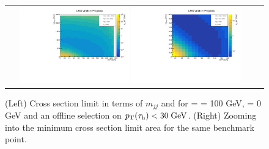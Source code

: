 \begin{figure}[tbh!]
	\centering
	\begin{tabular}{cc}
		\includegraphics[width=0.45\textwidth]{analysis/pics/JetInvMass_vs_MET_xsec_chi100_lsp000_taupt30.pdf}
		\includegraphics[width=0.45\textwidth]{analysis/pics/JetInvMass_vs_MET_xsec_chi100_lsp000_taupt30_zoom.pdf} 		
	\end{tabular}
	\caption{(Left) Cross section limit in terms of $m_{jj}$ and \met for \charginopm = \neutralinotwo = 100 GeV, \neutralinoone = 0 GeV and an offline selection on $p_{\text{T}}(\tau_{\text{h}}) <  30\;\text{Ge}\kern-0.06667em\text{V}$. (Right) Zooming into the minimum cross section limit area for the same benchmark point.}
	\label{fig::JetInvMass_vs_MET_xsec_chi100_lsp000_taupt30}
\end{figure}

